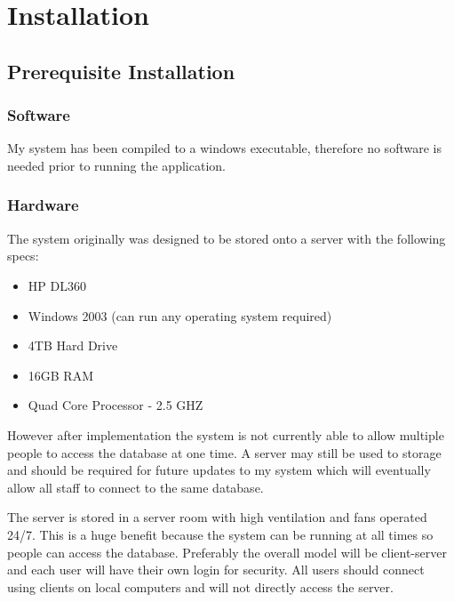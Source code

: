 \section{Installation}

\subsection{Prerequisite Installation}

\subsubsection{Software}

My system has been compiled to a windows executable, therefore no software is needed prior to running the application.

\subsubsection{Hardware}

The system originally was designed to be stored onto a server with the following specs:

\begin{itemize}
\item HP DL360
\item Windows 2003 (can run any operating system required)
\item 4TB Hard Drive
\item 16GB RAM
\item Quad Core Processor - 2.5 GHZ
\end{itemize}

However after implementation the system is not currently able to allow multiple people to access the database at one time. A server may still be used to storage and should be required for future updates to my system which will eventually allow all staff to connect to the same database.

The server is stored in a server room with high ventilation and fans operated 24/7. This is a huge benefit because the system can be running at all times so people can access the database. Preferably the overall model will be client-server and each user will have their own login for security. All users should connect using clients on local computers and will not directly access the server.

